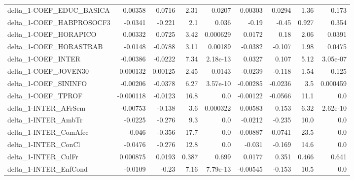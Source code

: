 \begin{tabular}{lrrrrrrrr}
delta\_1-COEF\_EDUC\_BASICA               &     0.00358 &       0.0716 &     2.31 &   0.0207 &    0.00303 &      0.0294 &         1.36 &         0.173 \\
delta\_1-COEF\_HABPROSOCF3               &     -0.0341 &       -0.221 &      2.1 &    0.036 &      -0.19 &       -0.45 &        0.927 &         0.354 \\
delta\_1-COEF\_HORAPICO                  &     0.00332 &       0.0725 &     3.42 & 0.000629 &     0.0172 &        0.18 &         2.06 &        0.0391 \\
delta\_1-COEF\_HORASTRAB                 &     -0.0148 &      -0.0788 &     3.11 &  0.00189 &    -0.0382 &      -0.107 &         1.98 &        0.0475 \\
delta\_1-COEF\_INTER                     &    -0.00386 &      -0.0222 &     7.34 & 2.18e-13 &     0.0327 &       0.107 &         5.12 &      3.05e-07 \\
delta\_1-COEF\_JOVEN30                   &    0.000132 &      0.00125 &     2.45 &   0.0143 &    -0.0239 &      -0.118 &         1.54 &         0.125 \\
delta\_1-COEF\_SININFO                   &    -0.00206 &      -0.0378 &     6.27 & 3.57e-10 &   -0.00285 &     -0.0236 &          3.5 &      0.000459 \\
delta\_1-COEF\_TPROF                     &   -0.000118 &      -0.0123 &     16.8 &      0.0 &   -0.00122 &     -0.0566 &         11.1 &           0.0 \\
delta\_1-INTER\_AFrSem                   &    -0.00753 &       -0.138 &      3.6 & 0.000322 &    0.00583 &       0.153 &         6.32 &      2.62e-10 \\
delta\_1-INTER\_AmbTr                    &     -0.0225 &       -0.276 &      9.3 &      0.0 &    -0.0212 &      -0.235 &         10.0 &           0.0 \\
delta\_1-INTER\_ComAfec                  &      -0.046 &       -0.356 &     17.7 &      0.0 &   -0.00887 &     -0.0741 &         23.5 &           0.0 \\
delta\_1-INTER\_ConCl                    &     -0.0476 &       -0.276 &     12.8 &      0.0 &     -0.031 &      -0.169 &         14.6 &           0.0 \\
delta\_1-INTER\_CulFr                    &    0.000875 &       0.0193 &    0.387 &    0.699 &     0.0177 &       0.351 &        0.466 &         0.641 \\
delta\_1-INTER\_EnfCond                  &     -0.0109 &        -0.23 &     7.16 & 7.79e-13 &   -0.00545 &      -0.153 &         10.5 &           0.0 \\

\end{tabular}
